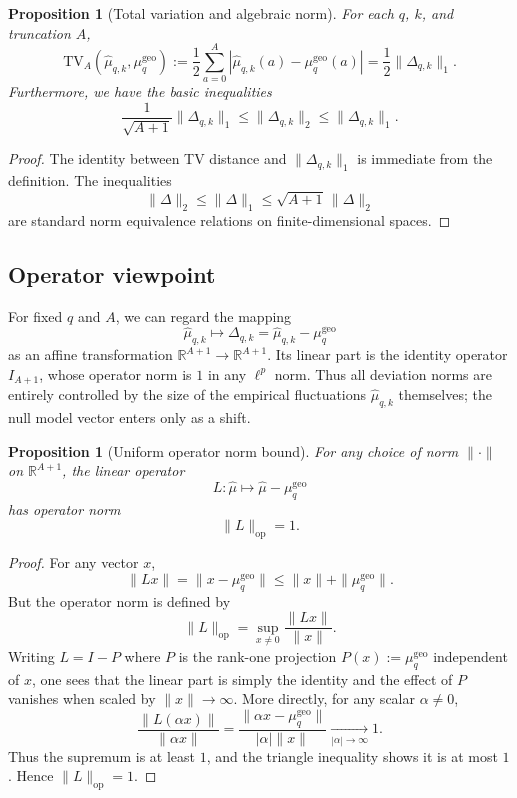 \documentclass[11pt]{article}
\theoremstyle{definition}
\theoremstyle{plain}
\newtheorem{proposition}[definition]{Proposition}
\theoremstyle{remark}
\newcommand{\1}{\mathbb{1}}
\begin{document}
\begin{proposition}[Total variation and algebraic norm]
For each \(q\), \(k\), and truncation \(A\),
\[
  \mathrm{TV}_{A}(\hat{\mu}_{q,k},\mu_q^{\mathrm{geo}})
  := \frac{1}{2}\sum_{a=0}^A |\hat{\mu}_{q,k}(a) - \mu_q^{\mathrm{geo}}(a)|
  = \frac{1}{2}\|\Delta_{q,k}\|_1.
\]
Furthermore, we have the basic inequalities
\[
  \frac{1}{\sqrt{A+1}}\|\Delta_{q,k}\|_1 \le \|\Delta_{q,k}\|_2 \le \|\Delta_{q,k}\|_1.
\]
\end{proposition}

\begin{proof}
The identity between TV distance and \(\|\Delta_{q,k}\|_1\) is immediate from the definition. The inequalities
\[
  \|\Delta\|_2 \le \|\Delta\|_1 \le \sqrt{A+1}\,\|\Delta\|_2
\]
are standard norm equivalence relations on finite-dimensional spaces.
\end{proof}

\subsection{Operator viewpoint}

For fixed \(q\) and \(A\), we can regard the mapping
\[
  \hat{\mu}_{q,k} \mapsto \Delta_{q,k} = \hat{\mu}_{q,k} - \mu_q^{\mathrm{geo}}
\]
as an affine transformation \(\mathbb{R}^{A+1}\to\mathbb{R}^{A+1}\). Its linear part is the identity operator \(I_{A+1}\), whose operator norm is \(1\) in any \(\ell^p\) norm. Thus all deviation norms are entirely controlled by the size of the empirical fluctuations \(\hat{\mu}_{q,k}\) themselves; the null model vector enters only as a shift.

\begin{proposition}[Uniform operator norm bound]
For any choice of norm \(\|\cdot\|\) on \(\mathbb{R}^{A+1}\), the linear operator
\[
  L\colon \hat{\mu} \mapsto \hat{\mu} - \mu_q^{\mathrm{geo}}
\]
has operator norm
\[
  \|L\|_{\mathrm{op}} = 1.
\]
\end{proposition}

\begin{proof}
For any vector \(x\),
\[
  \|Lx\| = \|x - \mu_q^{\mathrm{geo}}\| \le \|x\| + \|\mu_q^{\mathrm{geo}}\|.
\]
But the operator norm is defined by
\[
  \|L\|_{\mathrm{op}} = \sup_{x\neq 0} \frac{\|Lx\|}{\|x\|}.
\]
Writing \(L = I - P\) where \(P\) is the rank-one projection \(P(x) := \mu_q^{\mathrm{geo}}\) independent of \(x\), one sees that the linear part is simply the identity and the effect of \(P\) vanishes when scaled by \(\|x\|\to\infty\). More directly, for any scalar \(\alpha\neq 0\),
\[
  \frac{\|L(\alpha x)\|}{\|\alpha x\|}
  = \frac{\|\alpha x - \mu_q^{\mathrm{geo}}\|}{|\alpha| \|x\|}
  \xrightarrow[|\alpha|\to\infty]{} 1.
\]
Thus the supremum is at least \(1\), and the triangle inequality shows it is at most \(1\). Hence \(\|L\|_{\mathrm{op}}=1\).
\end{proof}
\end{document}

